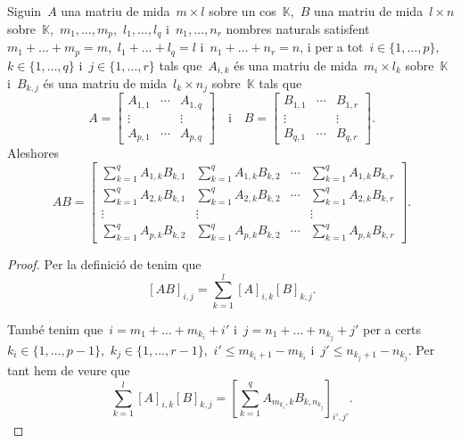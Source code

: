 \documentclass[../../main.tex]{subfiles}
\begin{document}
    \begin{proposition}
        \label{prop:producte de matrius en blocs}
        Siguin~\(A\) una matriu de mida~\(m\times l\) sobre un cos~\(\mathbb{K}\),~\(B\) una matriu de mida~\(l\times n\) sobre~\(\mathbb{K}\),~\(m_{1},\dots,m_{p}\),~\(l_{1},\dots,l_{q}\) i~\(n_{1},\dots,n_{r}\) nombres naturals satisfent~\(m_{1}+\dots+m_{p}=m\),~\(l_{1}+\dots+l_{q}=l\) i~\(n_{1}+\dots+n_{r}=n\), i per a tot~\(i\in\{1,\dots,p\}\),~\(k\in\{1,\dots,q\}\) i~\(j\in\{1,\dots,r\}\) tals que~\(A_{i,k}\) és una matriu de mida~\(m_{i}\times l_{k}\) sobre~\(\mathbb{K}\) i~\(B_{k,j}\) és una matriu de mida~\(l_{k}\times n_{j}\) sobre~\(\mathbb{K}\) tals que
        \[A=\left[\begin{matrix}
        A_{1,1} & \cdots & A_{1,q} \\
        \vdots & & \vdots \\
        A_{p,1} & \cdots & A_{p,q}
        \end{matrix}\right]\quad\text{i}\quad B=\left[\begin{matrix}
        B_{1,1} & \cdots & B_{1,r} \\
        \vdots & & \vdots \\
        B_{q,1} & \cdots & B_{q,r}
        \end{matrix}\right].\]
        Aleshores
        \[AB=\left[\begin{matrix}
        \sum_{k=1}^{q}A_{1,k}B_{k,1} & \sum_{k=1}^{q}A_{1,k}B_{k,2} & \cdots & \sum_{k=1}^{q}A_{1,k}B_{k,r} \\
        \sum_{k=1}^{q}A_{2,k}B_{k,1} & \sum_{k=1}^{q}A_{2,k}B_{k,2} & \cdots & \sum_{k=1}^{q}A_{2,k}B_{k,r} \\
        \vdots & \vdots & & \vdots \\
        \sum_{k=1}^{q}A_{p,k}B_{k,2} & \sum_{k=1}^{q}A_{p,k}B_{k,2} & \cdots & \sum_{k=1}^{q}A_{p,k}B_{k,r}
        \end{matrix}\right].\]
        \begin{proof}
            Per la definició de  tenim que
            \[
                [AB]_{i,j}=\sum_{k=1}^{l}[A]_{i,k}[B]_{k,j}.
            \]

            També tenim que~\(i=m_{1}+\dots+m_{k_{i}}+i'\) i~\(j=n_{1}+\dots+n_{k_{j}}+j'\) per a certs~\(k_{i}\in\{1,\dots,p-1\}\),~\(k_{j}\in\{1,\dots,r-1\}\),~\(i'\leq m_{k_{i}+1}-m_{k_{i}}\) i~\(j'\leq n_{k_{j}+1}-n_{k_{j}}\).
            Per tant hem de veure que
            \[
                \sum_{k=1}^{l}[A]_{i,k}[B]_{k,j}=\left[\sum_{k=1}^{q}A_{m_{k_{i}},k}B_{k,n_{k_{j}}}\right]_{i',j'}.
            \]


\end{proof}
\end{proposition}
\end{document}
